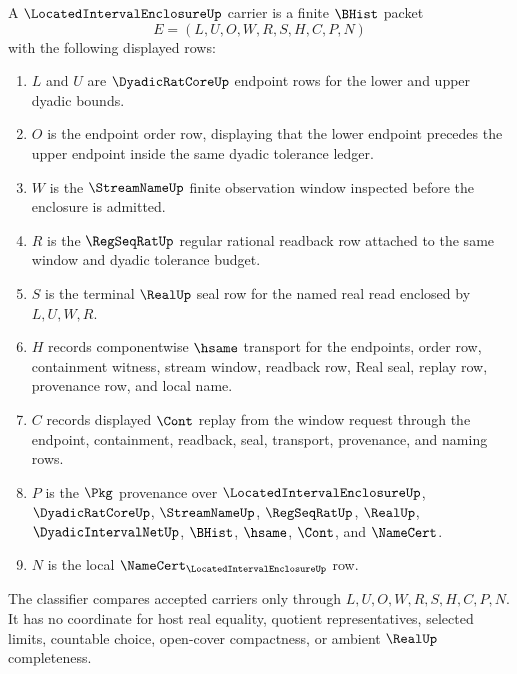 \begin{definition}
\label{def:located-interval-enclosure-carrier}
A $\LocatedIntervalEnclosureUp$ carrier is a finite $\BHist$ packet
$$
E=(L,U,O,W,R,S,H,C,P,N)
$$
with the following displayed rows:
\begin{enumerate}
\item $L$ and $U$ are $\DyadicRatCoreUp$ endpoint rows for the lower and upper dyadic bounds.
\item $O$ is the endpoint order row, displaying that the lower endpoint precedes the upper endpoint inside the same dyadic tolerance ledger.
\item $W$ is the $\StreamNameUp$ finite observation window inspected before the enclosure is admitted.
\item $R$ is the $\RegSeqRatUp$ regular rational readback row attached to the same window and dyadic tolerance budget.
\item $S$ is the terminal $\RealUp$ seal row for the named real read enclosed by $L,U,W,R$.
\item $H$ records componentwise $\hsame$ transport for the endpoints, order row, containment witness, stream window, readback row, Real seal, replay row, provenance row, and local name.
\item $C$ records displayed $\Cont$ replay from the window request through the endpoint, containment, readback, seal, transport, provenance, and naming rows.
\item $P$ is the $\Pkg$ provenance over $\LocatedIntervalEnclosureUp$, $\DyadicRatCoreUp$, $\StreamNameUp$, $\RegSeqRatUp$, $\RealUp$, $\DyadicIntervalNetUp$, $\BHist$, $\hsame$, $\Cont$, and $\NameCert$.
\item $N$ is the local $\NameCert_{\LocatedIntervalEnclosureUp}$ row.
\end{enumerate}
The classifier compares accepted carriers only through $L,U,O,W,R,S,H,C,P,N$. It has no coordinate for host real equality, quotient representatives, selected limits, countable choice, open-cover compactness, or ambient $\RealUp$ completeness.
\end{definition}

